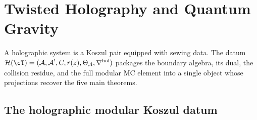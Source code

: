 
\chapter{Twisted Holography and Quantum Gravity}
\label{chap:twisted-holography-quantum-gravity}

A holographic system is a Koszul pair equipped with sewing data. The
datum $\cH(\cT) = (\cA, \cA^!, C, r(z), \Theta_\cA, \nabla^{\mathrm{hol}})$
packages the boundary algebra, its dual, the collision residue, and the
full modular MC element into a single object whose projections recover
the five main theorems.

\providecommand{\Bbbk}{\mathbb{k}}
\providecommand{\HS}{\operatorname{HS}}
\providecommand{\wt}{\operatorname{wt}}
\providecommand{\CE}{\operatorname{CE}}
\providecommand{\End}{\operatorname{End}}
\providecommand{\Hom}{\operatorname{Hom}}
\providecommand{\Sym}{\operatorname{Sym}}
\providecommand{\id}{\mathrm{id}}
\providecommand{\Tr}{\operatorname{Tr}}
\providecommand{\Det}{\operatorname{Det}}
\providecommand{\Aut}{\operatorname{Aut}}
\providecommand{\Fred}{\operatorname{Fred}}
\providecommand{\Spec}{\operatorname{Spec}}
\providecommand{\Res}{\operatorname{Res}}
\providecommand{\rank}{\operatorname{rank}}
\providecommand{\ad}{\operatorname{ad}}

\section{The holographic modular Koszul datum}
\label{sec:thqg-holographic-datum}

